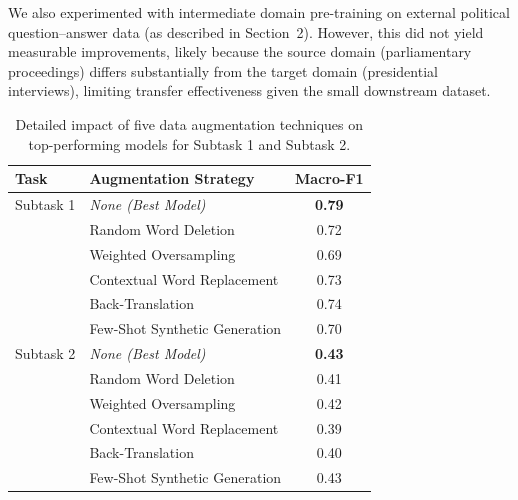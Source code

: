\documentclass[11pt]{article}
\begin{document}
We also experimented with intermediate domain pre-training on external political question–answer data (as described in Section~2). However, this did not yield measurable improvements, likely because the source domain (parliamentary proceedings) differs substantially from the target domain (presidential interviews), limiting transfer effectiveness given the small downstream dataset.

\begin{table}[h]
\centering
\small
\begin{tabular}{llc}
\hline
\textbf{Task} & \textbf{Augmentation Strategy} & \textbf{Macro-F1} \\
\hline
Subtask 1 & \textit{None (Best Model)} & \textbf{0.79} \\
& Random Word Deletion & 0.72 \\
& Weighted Oversampling & 0.69 \\
& Contextual Word Replacement & 0.73 \\
& Back-Translation & 0.74 \\
& Few-Shot Synthetic Generation & 0.70 \\
\hline
Subtask 2 & \textit{None (Best Model)} & \textbf{0.43} \\
& Random Word Deletion & 0.41 \\
& Weighted Oversampling & 0.42 \\
& Contextual Word Replacement & 0.39 \\
& Back-Translation& 0.40 \\
& Few-Shot Synthetic Generation & 0.43 \\
\hline
\end{tabular}
\caption{Detailed impact of five data augmentation techniques on top-performing models for Subtask 1 and Subtask 2.}
\label{tab:augmentation_full_results}
\end{table}
\end{document}
